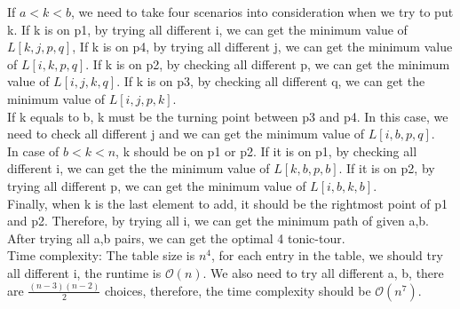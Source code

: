 \documentclass[12pt,letterpaper]{article}
\begin{document}
If $a < k < b$, we need to take four scenarios into consideration when we try to put k. If k is on p1, by trying all different i, we can get the minimum value of $L[k, j, p, q]$, If k is on p4, by trying all different j, we can get the minimum value of $L[i, k, p, q]$. If k is on p2, by checking all different p, we can get the minimum value of $L[i, j, k, q]$. If k is on p3, by checking all different q, we can get the minimum value of $L[i, j, p, k]$. \\
If k equals to b, k must be the turning point between p3 and p4. In this case, we need to check all different j and we can get the minimum value of $L[i, b, p, q]$. \\ 
In case of $b < k < n$, k should be on p1 or p2. If it is on p1, by checking all different i, we can get the the minimum value of $L[k, b, p, b]$. If it is on p2, by trying all different p, we can get the minimum value of $L[i, b, k, b]$.  \\
Finally, when k is the last element to add, it should be the rightmost point of p1 and p2. Therefore, by trying all i, we can get the minimum path of given a,b. After trying all a,b pairs, we can get the optimal 4 tonic-tour. \\
Time complexity:
The table size is $n^4$, for each entry in the table, we should try all different i, the runtime is $\mathcal{O}(n)$. We also need to try all different a, b, there are $\frac{(n-3)(n-2)}{2}$ choices, therefore, the time complexity should be $\mathcal{O}(n^7)$.
\end{document}
